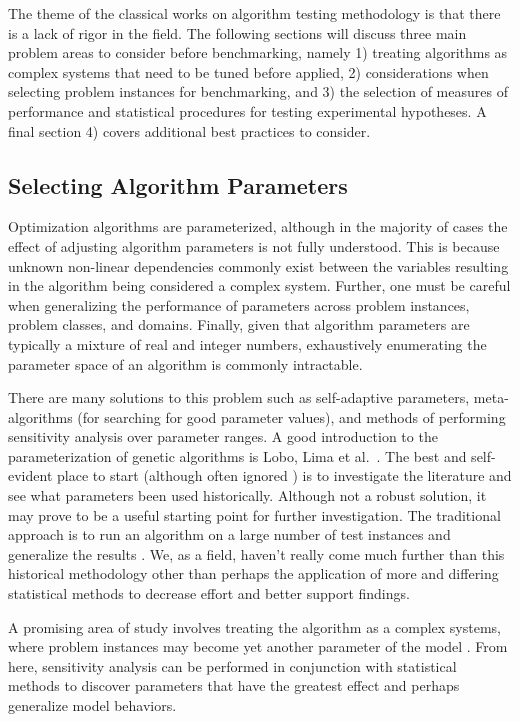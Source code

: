 The theme of the classical works on algorithm testing methodology is that there is a lack of rigor in the field. The following sections will discuss three main problem areas to consider before benchmarking, namely 1) treating algorithms as complex systems that need to be tuned before applied, 2) considerations when selecting problem instances for benchmarking, and 3) the selection of measures of performance and statistical procedures for testing experimental hypotheses. A final section 4) covers additional best practices to consider.


% 
% 
\subsection{Selecting Algorithm Parameters}
Optimization algorithms are parameterized, although in the majority of cases the effect of adjusting algorithm parameters is not fully understood. This is because unknown non-linear dependencies commonly exist between the variables resulting in the algorithm being considered a complex system. Further, one must be careful when generalizing the performance of parameters across problem instances, problem classes, and domains. Finally, given that algorithm parameters are typically a mixture of real and integer numbers, exhaustively enumerating the parameter space of an algorithm is commonly intractable.

There are many solutions to this problem such as self-adaptive parameters, meta-algorithms (for searching for good parameter values), and methods of performing sensitivity analysis over parameter ranges. A good introduction to the parameterization of genetic algorithms is Lobo, Lima et al.\ \cite{Lobo2007}. The best and self-evident place to start (although often ignored \cite{Eiben2002}) is to investigate the literature and see what parameters been used historically. Although not a robust solution, it may prove to be a useful starting point for further investigation. The traditional approach is to run an algorithm on a large number of test instances and generalize the results \cite{Schaffer1989}. We, as a field, haven't really come much further than this historical methodology other than perhaps the application of more and differing statistical methods to decrease effort and better support findings.

A promising area of study involves treating the algorithm as a complex systems, where problem instances may become yet another parameter of the model \cite{Saltelli2002, Campolongo2000}. From here, sensitivity analysis can be performed in conjunction with statistical methods to discover parameters that have the greatest effect \cite{Chan1997} and perhaps generalize model behaviors.

